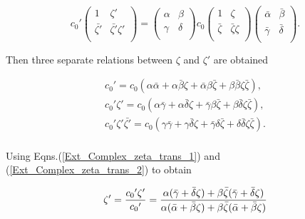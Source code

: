 \begin{equation*}
{c_0}'\left(
\begin{array}{cc}
1           & \zeta' \\ 
\bar{\zeta'} & \bar{\zeta'}\zeta' \\ 
\end{array}
\right)
=
\left(
\begin{array}{cc}
\alpha & \beta \\
\gamma & \delta \\
\end{array}
\right)
{c_0}\left(
\begin{array}{cc}
1           & \zeta \\ 
\bar{\zeta} & \bar{\zeta}\zeta \\ 
\end{array}
\right)
\left(
\begin{array}{cc}
\bar{\alpha} & \bar{\beta} \\
\bar{\gamma} & \bar{\delta} \\
\end{array}
\right).
\end{equation*}

\noindent Then three separate relations between $\zeta$ and $\zeta'$ are obtained

\begin{eqnarray}\label{Ext_Complex_zeta_trans_1} 
{c_0}' = c_0 (\alpha \bar{\alpha} + \alpha \bar{\beta} \zeta + \bar{\alpha} \beta \bar{\zeta} + \beta \bar{\beta} \zeta \bar{\zeta}), \\\label{Ext_Complex_zeta_trans_2} 
{c_0}'\zeta' = c_0 (\alpha \bar{\gamma} + \alpha \bar{\delta} \zeta + \bar{\gamma} \beta \bar{\zeta} + \beta \bar{\delta} \zeta \bar{\zeta}), \\\label{Ext_Complex_zeta_trans_3} 
{c_0}'\zeta'\bar{\zeta'} = c_0 (\gamma \bar{\gamma} + \gamma \bar{\delta} \zeta + \bar{\gamma} \delta \bar{\zeta} + \delta \bar{\delta} \zeta \bar{\zeta}). \\
\end{eqnarray} 

\noindent Using Eqns.(\ref{Ext_Complex_zeta_trans_1}) and (\ref{Ext_Complex_zeta_trans_2}) to obtain

\begin{equation*}
\zeta' = \frac{{c_0}'\zeta'}{{c_0}'} = \frac{\alpha(\bar{\gamma} + \bar{\delta}\zeta) + \beta \bar{\zeta}(\bar{\gamma} + \bar{\delta}\zeta)}{\alpha(\bar{\alpha} + \bar{\beta}\zeta) + \beta \bar{\zeta}(\bar{\alpha} + \bar{\beta}\zeta)} \\
\end{equation*}

